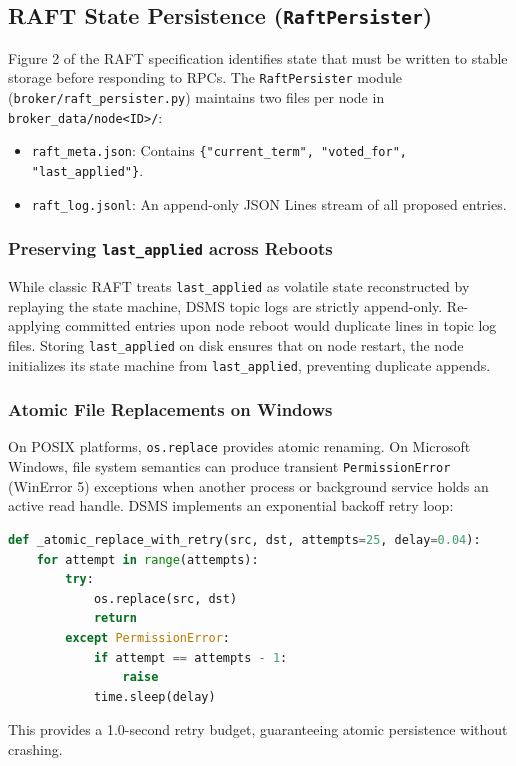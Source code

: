 \documentclass[11pt,a4paper]{article}
\begin{document}
\subsection{RAFT State Persistence (\texttt{RaftPersister})}
Figure 2 of the RAFT specification identifies state that must be written to stable storage before responding to RPCs. The \texttt{RaftPersister} module (\texttt{broker/raft\_persister.py}) maintains two files per node in \texttt{broker\_data/node<ID>/}:
\begin{itemize}[leftmargin=*]
    \item \texttt{raft\_meta.json}: Contains \texttt{\{"current\_term", "voted\_for", "last\_applied"\}}.
    \item \texttt{raft\_log.jsonl}: An append-only JSON Lines stream of all proposed entries.
\end{itemize}

\subsubsection{Preserving \texttt{last\_applied} across Reboots}
While classic RAFT treats \texttt{last\_applied} as volatile state reconstructed by replaying the state machine, DSMS topic logs are strictly append-only. Re-applying committed entries upon node reboot would duplicate lines in topic log files. Storing \texttt{last\_applied} on disk ensures that on node restart, the node initializes its state machine from \texttt{last\_applied}, preventing duplicate appends.

\subsubsection{Atomic File Replacements on Windows}
On POSIX platforms, \texttt{os.replace} provides atomic renaming. On Microsoft Windows, file system semantics can produce transient \texttt{PermissionError} (WinError 5) exceptions when another process or background service holds an active read handle. DSMS implements an exponential backoff retry loop:
\begin{lstlisting}[language=Python]
def _atomic_replace_with_retry(src, dst, attempts=25, delay=0.04):
    for attempt in range(attempts):
        try:
            os.replace(src, dst)
            return
        except PermissionError:
            if attempt == attempts - 1:
                raise
            time.sleep(delay)
\end{lstlisting}
This provides a 1.0-second retry budget, guaranteeing atomic persistence without crashing.
\end{document}
